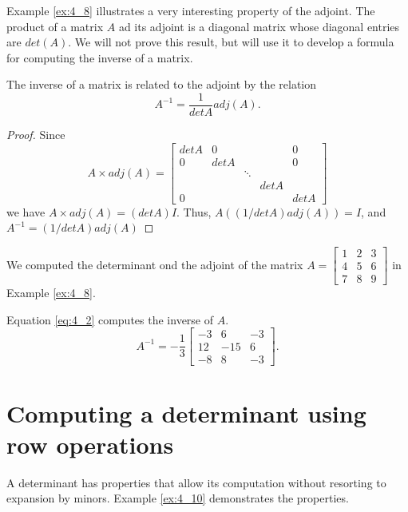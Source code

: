 \documentclass[../main.tex]{subfiles}
\begin{document}
Example \ref{ex:4_8} illustrates a very interesting property of the adjoint. The product of a matrix \(A\) ad its adjoint is a diagonal matrix whose diagonal entries are \(det(A)\). We will not prove this result, but will use it to develop a formula for computing the inverse of a matrix.

\begin{theorem} \label{th:4_3}
  The inverse of a matrix is related to the adjoint by the relation
  \begin{equation} \label{eq:4_2}
    A^{-1} = \frac{1}{detA} adj(A).
  \end{equation}
  \begin{proof}
    Since \begin{equation*}
      A \times adj(A) = \begin{bmatrix}
        det A & 0 & & & 0\\
        0 & det A & & & 0\\
        & & \ddots\\
        & & & det A & \\
        0 & & & & detA
      \end{bmatrix}
    \end{equation*}
    we have \(A \times adj(A) = (det A)I\). Thus, \(A((1/det A)adj(A)) = I\), and \(A^{-1} = (1/det A) adj(A)\)
  \end{proof}
\end{theorem}

\begin{example} \label{ex:4_9}
  We computed the determinant ond the adjoint of the matrix \(A = \begin{bmatrix}
    1 & 2 & 3\\
    4 & 5 & 6\\
    7 & 8 & 9
  \end{bmatrix}\)
  in Example \ref{ex:4_8}.
  
  Equation \ref{eq:4_2} computes the inverse of \(A\).
  \begin{equation*}
    A^{-1} = -\frac{1}{3}\begin{bmatrix}
      -3 & 6 & -3\\
      12 & -15 & 6\\
      -8 & 8 & -3
    \end{bmatrix}.
  \end{equation*}
\end{example}

\section{Computing a determinant using row operations}
\noindent A determinant has properties that allow its computation without resorting to expansion by minors. Example \ref{ex:4_10} demonstrates the properties.
\end{document}
